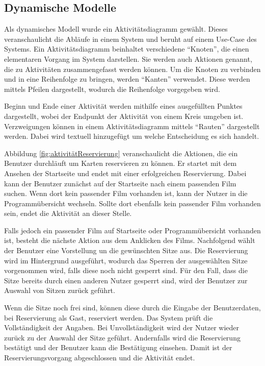 		\subsection{Dynamische Modelle}
				Als dynamisches Modell wurde ein Aktivitätsdiagramm gewählt. Dieses veranschaulicht die Abläufe in einem System und beruht auf einem Use-Case des Systems. Ein Aktivitätsdiagramm beinhaltet verschiedene \enquote{Knoten}, die einen elementaren Vorgang im System darstellen. Sie werden auch Aktionen genannt, die zu Aktivitäten zusammengefasst werden können. Um die Knoten zu verbinden und in eine Reihenfolge zu bringen, werden \enquote{Kanten} verwendet. Diese werden mittels Pfeilen dargestellt, wodurch die Reihenfolge vorgegeben wird. 
				
				Beginn und Ende einer Aktivität werden mithilfe eines ausgefüllten Punktes dargestellt, wobei der Endpunkt der Aktivität von einem Kreis umgeben ist. Verzweigungen können in einem Aktivitätsdiagramm mittels \enquote{Rauten} dargestellt werden. Dabei wird textuell hinzugefügt um welche Entscheidung es sich handelt. 
				
				Abbildung \vref{fig:aktivitätReservierung} veranschaulicht die Aktionen, die ein Benutzer durchläuft um Karten reservieren zu können. Er startet mit dem Ansehen der Startseite und endet mit einer erfolgreichen Reservierung. Dabei kann der Benutzer zunächst auf der Startseite nach einem passenden Film suchen. Wenn dort kein passender Film vorhanden ist, kann der Nutzer in die Programmübersicht wechseln. Sollte dort ebenfalls kein passender Film vorhanden sein, endet die Aktivität an dieser Stelle. 
								
				Falls jedoch ein passender Film auf Startseite oder Programmübersicht vorhanden ist, besteht die nächste Aktion aus dem Anklicken des Films. Nachfolgend wählt der Benutzer eine Vorstellung un die gewünschten Sitze aus. Die Reservierung wird im Hintergrund ausgeführt, wodurch das Sperren der ausgewählten Sitze vorgenommen wird, falls diese noch nicht gesperrt sind. Für den Fall, dass die Sitze bereits durch einen anderen Nutzer gesperrt sind, wird der Benutzer zur Auswahl von Sitzen zurück geführt. 
								
				Wenn die Sitze noch frei sind, können diese durch die Eingabe der Benutzerdaten, bei Reservierung als Gast, reserviert werden. Das System prüft die Vollständigkeit der Angaben. Bei Unvollständigkeit wird der Nutzer wieder zurück zu der Auswahl der Sitze geführt. Andernfalls wird die Reservierung bestätigt und der Benutzer kann die Bestätigung einsehen. Damit ist der Reservierungsvorgang abgeschlossen und die Aktivität endet.   
						 
